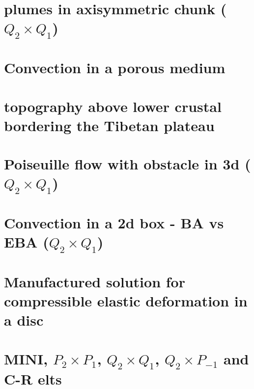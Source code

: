 \documentclass[a4paper,11pt]{report}
\begin{document}
\chapter{plumes in axisymmetric chunk ($Q_2\times Q_1$)  \label{f106}} %

\chapter{Convection in a porous medium  \label{f107}} %

\chapter{topography above lower crustal bordering the Tibetan plateau \label{f108}} %

\chapter{Poiseuille flow with obstacle in 3d ($Q_2\times Q_1$) \label{f109}} %

\chapter{Convection in a 2d box - BA vs EBA ($Q_2\times Q_1$) \label{f110}} %

\chapter{Manufactured solution for compressible elastic deformation in a disc\label{f111}} %

\chapter{MINI, $P_2\times P_1$,  $Q_2\times Q_1$, $Q_2\times P_{-1}$ and C-R elts\label{f112}} %
\end{document}
